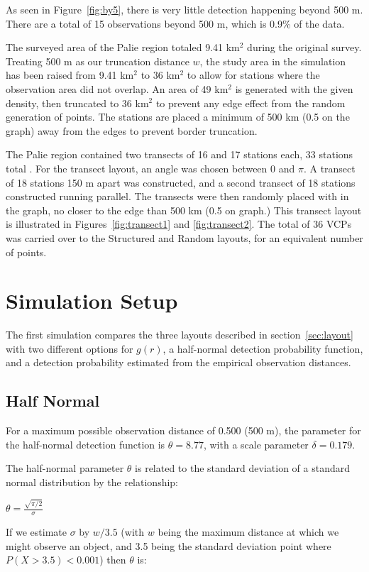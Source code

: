 \documentclass[12pt]{article}
\begin{document}
As seen in Figure~\ref{fig:by5}, there is very little detection happening beyond 500 m. There are a total of 15 observations beyond 500 m, which is 0.9\% of the data. 

The surveyed area of the Palie region totaled 9.41 km$^2$ during the original survey. Treating 500 m as our truncation distance $w$, the study area in the simulation has been raised from 9.41 km$^2$ to 36 km$^2$ to allow for stations where the observation area did not overlap. An area of 49 km$^2$ is generated with the given density, then truncated to 36 km$^2$ to prevent any edge effect from the random generation of points. The stations are placed a minimum of 500 km (0.5 on the graph) away from the edges to prevent border truncation. 

The Palie region contained two transects of 16 and 17 stations each, 33 stations total \parencite{micronesian}. For the transect layout, an angle was chosen between $0$ and $\pi$. A transect of 18 stations 150 m apart was constructed, and a second transect of 18 stations constructed running parallel. The transects were then randomly placed with in the graph, no closer to the edge than 500 km (0.5 on graph.) This transect layout is illustrated in Figures~\ref{fig:transect1} and \ref{fig:transect2}. The total of 36 VCPs was carried over to the Structured and Random layouts, for an equivalent number of points.

\section{Simulation Setup}
The first simulation compares the three layouts described in section~\ref{sec:layout} with two different options for $g(r)$, a half-normal detection probability function, and a detection probability estimated from the empirical observation distances.
\subsection{Half Normal}
For a maximum possible observation distance of 0.500 (500 m), the parameter for the half-normal detection function is $\theta = 8.77$, with a scale parameter $\delta = 0.179$.

The half-normal parameter $\theta$ is related to the standard deviation of a standard normal distribution by the relationship:

$\theta = \frac{\sqrt{\pi /2}}{\sigma}$

If we estimate $\sigma$ by $w/3.5$ (with $w$ being the maximum distance at which we might observe an object, and 3.5 being the standard deviation point where $P(X > 3.5) < 0.001$) then $\theta$ is:
\end{document}

